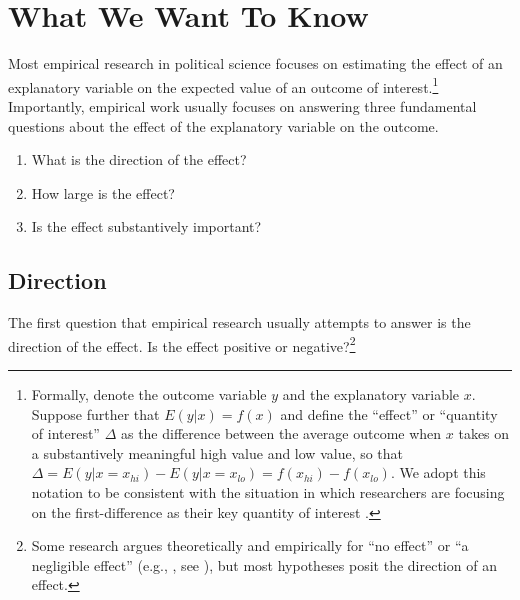 \documentclass[12pt]{article}
\begin{document}
\section*{What We Want To Know}

Most empirical research in political science focuses on estimating the effect of an explanatory variable on the expected value of an outcome of interest.\footnote{Formally, denote the outcome variable $y$ and the explanatory variable $x$. Suppose further that $E(y | x) = f(x)$ and define the ``effect'' or ``quantity of interest'' $\Delta$ as the difference between the average outcome when $x$ takes on a substantively meaningful high value and low value, so that $\Delta = E(y | x = x_{hi}) - E(y | x = x_{lo}) = f(x_{hi}) - f(x_{lo})$. We adopt this notation to be consistent with the situation in which researchers are focusing on the first-difference as their key quantity of interest \citep{KingTomzWittenberg2000}.} Importantly, empirical work usually focuses on answering three fundamental questions about the effect of the explanatory variable on the outcome.

\begin{enumerate}
\item What is the direction of the effect?
\item How large is the effect?
\item Is the effect substantively important?
\end{enumerate}

\subsection*{Direction}

The first question that empirical research usually attempts to answer is the direction of the effect. Is the effect positive or negative?\footnote{Some research argues theoretically and empirically for ``no effect'' or ``a negligible effect'' (e.g., \citealt{KamPalmer2008}, see \citealt{Rainey2014a}), but most hypotheses posit the direction of an effect.} 
\end{document}
